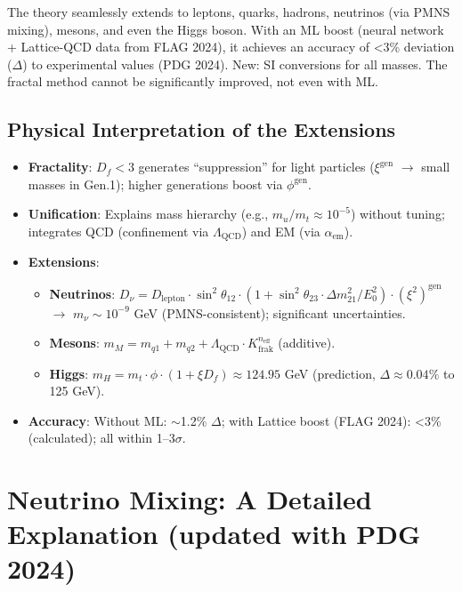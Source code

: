 	The theory seamlessly extends to leptons, quarks, hadrons, neutrinos (via PMNS mixing), mesons, and even the Higgs boson. With an ML boost (neural network + Lattice-QCD data from FLAG 2024), it achieves an accuracy of <3\% deviation ($\Delta$) to experimental values (PDG 2024). New: SI conversions for all masses. The fractal method cannot be significantly improved, not even with ML.
	
	\subsection{Physical Interpretation of the Extensions}
	\begin{itemize}
		\item \textbf{Fractality}: $D_f < 3$ generates ``suppression'' for light particles ($\xi^{\text{gen}}$ $\rightarrow$ small masses in Gen.1); higher generations boost via $\phi^{\text{gen}}$.
		\item \textbf{Unification}: Explains mass hierarchy (e.g., $m_u / m_t \approx 10^{-5}$) without tuning; integrates QCD (confinement via $\Lambda_{\text{QCD}}$) and EM (via $\alpha_{\text{em}}$).
		\item \textbf{Extensions}:
		\begin{itemize}
			\item \textbf{Neutrinos}: $D_\nu = D_{\text{lepton}} \cdot \sin^2 \theta_{12} \cdot (1 + \sin^2 \theta_{23} \cdot \Delta m^2_{21}/E_0^2) \cdot (\xi^2)^{\text{gen}}$ $\rightarrow$ $m_\nu \sim 10^{-9}$ GeV (PMNS-consistent); significant uncertainties.
			\item \textbf{Mesons}: $m_M = m_{q1} + m_{q2} + \Lambda_{\text{QCD}} \cdot K_{\text{frak}}^{n_{\text{eff}}}$ (additive).
			\item \textbf{Higgs}: $m_H = m_t \cdot \phi \cdot (1 + \xi D_f) \approx 124.95$ GeV (prediction, $\Delta \approx 0.04\%$ to 125 GeV).
		\end{itemize}
		\item \textbf{Accuracy}: Without ML: $\sim$1.2\% $\Delta$; with Lattice boost (FLAG 2024): <3\% (calculated); all within 1--3$\sigma$.
	\end{itemize}
	
	\section{Neutrino Mixing: A Detailed Explanation (updated with PDG 2024)}
	\label{app:neutrino}
	
